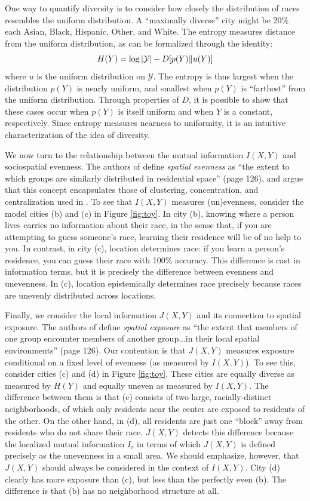 	One way to quantify diversity is to consider how closely the distribution of races resembles the uniform distribution. A ``maximally diverse'' city might be 20\% each Asian, Black, Hispanic, Other, and White. The entropy measures distance from the uniform distribution, as can be formalized through the identity: 
	\begin{equation}
		H(Y) = \log \left|\mathcal{Y}\right| - D[p(Y)\|u(Y)]
	\end{equation}
	where $u$ is the uniform distribution on $\mathcal{Y}$. The entropy is thus largest when the distribution $p(Y)$ is nearly uniform, and smallest when $p(Y)$ is ``farthest'' from the uniform distribution. Through properties of $D$, it is possible to show that these cases occur when $p(Y)$ is itself uniform and when $Y$ is a constant, respectively. Since entropy measures nearness to uniformity, it is an intuitive characterization of the idea of diversity. 

	We now turn to the relationship between the mutual information $I(X,Y)$ and sociospatial evenness. The authors of \cite{Reardon2002} define \emph{spatial evenness} as ``the extent to which groups are similarly distributed in residential space'' (page 126), and argue that this concept encapsulates those of clustering, concentration, and centralization used in \cite{Massey1988}. To see that $I(X,Y)$ measures (un)evenness, consider the model cities (b) and (c) in Figure \ref{fig:toy}. In city (b), knowing where a person lives carries no information about their race, in the sense that, if you are attempting to guess someone's race, learning their residence will be of no help to you. In contrast, in city (c), location determines race: if you learn a person's residence, you can guess their race with 100\% accuracy. This difference is cast in information terms, but it is precisely the difference between evenness and unevenness. In (c), location epistemically determines race precisely because races are unevenly distributed across locations. 

	Finally, we consider the local information $J(X,Y)$ and its connection to spatial exposure. The authors of \cite{Reardon2002} define \emph{spatial exposure} as ``the extent that members of one group encounter members of another group...in their local spatial environments'' (page 126). Our contention is that $J(X,Y)$ measures exposure conditional on a fixed level of evenness (as measured by $I(X,Y)$). To see this, consider cities (c) and (d) in Figure \ref{fig:toy}. These cities are equally diverse as measured by $H(Y)$ and equally uneven as measured by $I(X,Y)$. The difference between them is that (c) consists of two large, racially-distinct neighborhoods, of which only residents near the center are exposed to residents of the other. On the other hand, in (d), all residents are just one ``block'' away from residents who do not share their race. $J(X,Y)$ detects this difference because the localized mutual information $I_r$ in terms of which $J(X,Y)$ is defined precisely as the unevenness in a small area. We should emphasize, however, that $J(X,Y)$ should always be considered in the context of $I(X,Y)$. City (d) clearly has more exposure than (c), but less than the perfectly even (b). The difference is that (b) has no neighborhood structure at all. 

